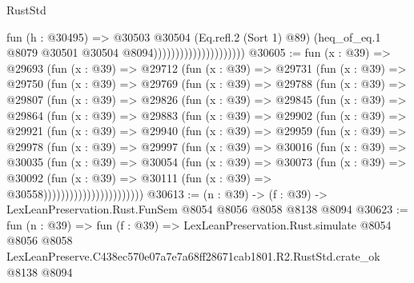 \begin{lexlean}{RustStd}
\begin{coremodule}
                                          fun (h : @30495) =>
                                          @30503
                                            @30504
                                            (Eq.refl.{2} (Sort 1) @89)
                                            (heq_of_eq.{1}
                                              @8079
                                              @30501
                                              @30504
                                              @8094)))))))))))))))))))))
@30605 := fun (x : @39) =>
  @29693
    (fun (x : @39) =>
    @29712
      (fun (x : @39) =>
      @29731
        (fun (x : @39) =>
        @29750
          (fun (x : @39) =>
          @29769
            (fun (x : @39) =>
            @29788
              (fun (x : @39) =>
              @29807
                (fun (x : @39) =>
                @29826
                  (fun (x : @39) =>
                  @29845
                    (fun (x : @39) =>
                    @29864
                      (fun (x : @39) =>
                      @29883
                        (fun (x : @39) =>
                        @29902
                          (fun (x : @39) =>
                          @29921
                            (fun (x : @39) =>
                            @29940
                              (fun (x : @39) =>
                              @29959
                                (fun (x : @39) =>
                                @29978
                                  (fun (x : @39) =>
                                  @29997
                                    (fun (x : @39) =>
                                    @30016
                                      (fun (x : @39) =>
                                      @30035
                                        (fun (x : @39) =>
                                        @30054
                                          (fun (x : @39) =>
                                          @30073
                                            (fun (x : @39) =>
                                            @30092
                                              (fun (x : @39) =>
                                              @30111 (fun (x : @39) => @30558)))))))))))))))))))))))
@30613 := (n : @39) -> (f : @39) -> LexLeanPreservation.Rust.FunSem @8054 @8056 @8058 @8138 @8094
@30623 := fun (n : @39) =>
  fun (f : @39) =>
  LexLeanPreservation.Rust.simulate
    @8054
    @8056
    @8058
    LexLeanPreserve.C438ec570e07a7e7a68ff28671cab1801.R2.RustStd.crate_ok
    @8138
    @8094
\end{coremodule}
\end{lexlean}
